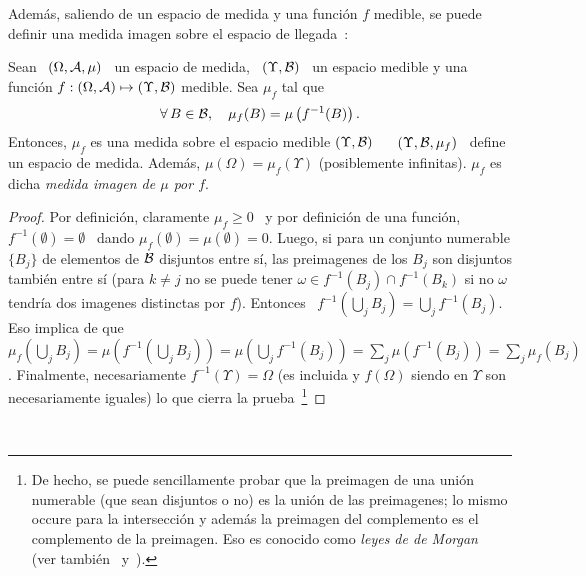 Adem\'as, saliendo de un espacio de medida y una funci\'on $f$ medible, se puede
definir una medida imagen  sobre el espacio de llegada~\cite{AthLah06, Bog07:v1,
  Coh13}:
%
\begin{teorema}\label{Th:MP:MedidaImagen}
  Sean  \ $(\Omega,\mathcal{A},\mu)$  \  un espacio  de  medida, \  $(\Upsilon,\mathcal{B})$ \  un
  espacio  medible  y  una  funci\'on  $f:  (\Omega,\mathcal{A})  \mapsto  (\Upsilon,\mathcal{B})$
  medible. Sea $\mu_f$ tal que
  \[
  \forall \,  B \in  \mathcal{B}, \quad  \mu_f(B) = \mu\left( f^{-1}(B) \right).
  \]
  Entonces, $\mu_f$ es una medida sobre el espacio medible $(\Upsilon,\mathcal{B})$ \ \ie
  \ $(\Upsilon,\mathcal{B},\mu_f)$ \ define un espacio de medida.  Adem\'as, $\mu(\Omega)
  =  \mu_f(\Upsilon)$ (posiblemente  infinitas).  $\mu_f$ es  dicha {\it  medida
    imagen de $\mu$ por $f$}.
\end{teorema}
%
\begin{proof}
  Por  definici\'on,  claramente $\mu_f  \ge  0$ \  y  por  definici\'on de  una
  funci\'on,  $f^{-1}(\emptyset)  =   \emptyset$  \  dando  $\mu_f(\emptyset)  =
  \mu(\emptyset) =  0$.  Luego,  si para  un conjunto numerable  $\{ B_j  \}$ de
  elementos  de $\mathcal{B}$  disjuntos entre  s\'i, las  preimagenes de  los  $B_j$ son
  disjuntos tambi\'en entre  s\'i (para $k \ne j$ no se  puede tener $\omega \in
  f^{-1}(B_j) \cap f^{-1}(B_k)$ si no $\omega$ tendr\'ia dos imagenes distinctas
  por  $f$).   Entonces  \  $f^{-1}\left(  \bigcup_j  B_j  \right)  =  \bigcup_j
  f^{-1}(B_j)$.   Eso implica  de que  \  $\mu_f\left( \bigcup_j  B_j \right)  =
  \mu\left(  f^{-1}\left( \bigcup_j  B_j \right)  \right) =  \mu\left( \bigcup_j
    f^{-1}(B_j)  \right)  =  \sum_j   \mu\left(  f^{-1}(B_j)  \right)  =  \sum_j
  \mu_f(B_j)$.   Finalmente,  necesariamente  $f^{-1}(\Upsilon)  =  \Omega$  (es
  incluida y $f(\Omega)$ siendo en $\Upsilon$ son necesariamente iguales) lo que
  cierra  la prueba~\footnote{De  hecho, se  puede sencillamente  probar  que la
    preimagen de una  uni\'on numerable (que sean disjuntos o  no) es la uni\'on
    de las  preimagenes; lo  mismo occure para  la intersecci\'on y  adem\'as la
    preimagen  del  complemento es  el  complemento  de  la preimagen.   Eso  es
    conocido como {\it leyes de de Morgan}~\cite{AthLah06, Coh13, HogMck13} (ver
    tambi\'en~\cite[Cap.~1]{KolFom57}
    y~\cite[Caps.~5~\&~6]{KolFom61}).\label{Foot:MP:Jacobiana}}
\end{proof}

\

